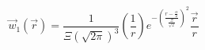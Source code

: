 \documentclass[letterpaper,twocolumn,amsmath,amssymb,prb]{revtex4-1}
\begin{document}
\begin{widetext}
\begin{equation}{\vec{w}_1(\vec{r})=\frac{1}{\Xi(\sqrt{2\pi})^3}\left(\frac{1}{r}\right)e^{-\left(\frac{r-\frac{\alpha}{2}}{\frac{\Xi}{\sqrt{2}}}\right)^2}\frac{\vec{r}}{r}}\end{equation}





\end{widetext}
\end{document}
